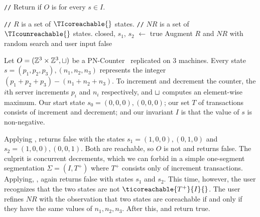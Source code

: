 \newcommand{\algocomment}[1]{\State \textcolor{flatdenim}{\texttt{//} #1}}
\begin{algorithm}[t]
  \caption{%
    Interactive invariant-confluence decision procedure for arbitrary start
    state $s \in I$
  }%
  \begin{algorithmic}
    \algocomment{Return if $O$ is  for every $s \in I$.}
      \State \Return {}
    \EndFunction

    \State

    \algocomment{$R$ is a set of $\TIcoreachable{}$ states.}
    \algocomment{$NR$ is a set of $\TIcounreachable{}$ states.}
      \State closed, $s_1$, $s_2$ $\gets$ 
        \State \Return true
      \EndIf
      \State Augment $R$ and $NR$ with random search and user input
        \Return false
      \Else\
        \Return {}
      \EndIf
    \EndFunction
  \end{algorithmic}
\end{algorithm}

\begin{example}
  Let $O = (\mathbb{Z}^3 \times \mathbb{Z}^3, \sqcup)$ be a
  PN-Counter~\cite{shapiro2011comprehensive} replicated on $3$ machines. Every
  state $s = (p_1, p_2, p_3), (n_1, n_2, n_3)$ represents the integer $(p_1 +
  p_2 + p_3) - (n_1 + n_2 + n_3)$. To increment and decrement the counter, the
  $i$th server increments $p_i$ and $n_i$ respectively, and $\sqcup$ computes an
  element-wise maximum. Our start state $s_0 = (0, 0, 0), (0, 0, 0)$; our set
  $T$ of transactions consists of increment and decrement; and our invariant
  $I$ is that the value of $s$ is non-negative.

  Applying , \IsIclosed{} returns false
  with the states $s_1 = (1, 0, 0), (0, 1, 0)$ and $s_2 = (1, 0, 0), (0, 0,
  1)$. Both are reachable, so $O$ is not \sTIconfluent{} and
   returns false.  The culprit is
  concurrent decrements, which we can forbid in a simple one-segment
  segmentation $\Sigma = (I, T^+)$ where $T^+$ consists only of increment
  transactions. Applying, ,
  \IsIclosed{} again returns false with states $s_1$ and $s_2$. This time,
  however, the user recognizes that the two states are not
  $\ticoreachable{T^+}{I}{}$. The user refines $NR$ with the observation that
  two states are coreachable if and only if they have the same values of $n_1,
  n_2, n_3$. After this, \IsIclosed{} and
   return true.
\end{example}

